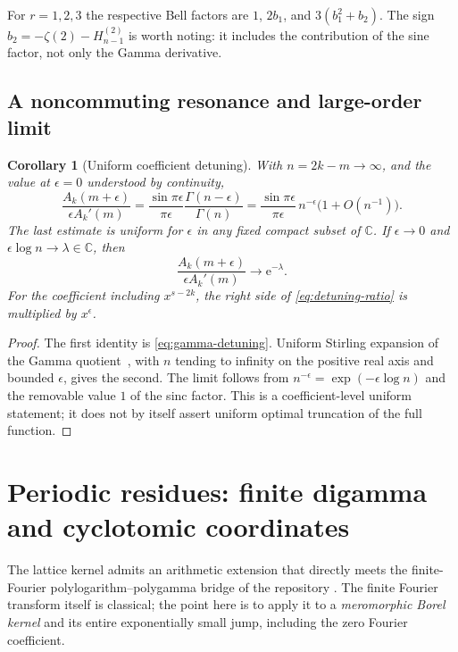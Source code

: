 \documentclass[11pt,a4paper]{article}
\newtheorem{corollary}[theorem]{Corollary}
\theoremstyle{definition}\newtheorem{definition}[theorem]{Definition}
\theoremstyle{remark}\newtheorem{remark}[theorem]{Remark}
\newcommand{\ee}{\mathrm e}
\newcommand{\C}{\mathbb C}
\numberwithin{equation}{section}
\begin{document}
For $r=1,2,3$ the respective Bell factors are
$1$, $2b_1$, and $3(b_1^2+b_2)$. The sign
$b_2=-\zeta(2)-H_{n-1}^{(2)}$ is worth noting: it includes the contribution
of the sine factor, not only the Gamma derivative.

\subsection{A noncommuting resonance and large-order limit}

\begin{corollary}[Uniform coefficient detuning]\label{cor:detuning}
With $n=2k-m\to\infty$, and the value at $\epsilon=0$ understood by
continuity,
\begin{equation}\label{eq:detuning-ratio}
 \frac{A_k(m+\epsilon)}{\epsilon A_k'(m)}
  =\frac{\sin\pi\epsilon}{\pi\epsilon}
          \frac{\Gamma(n-\epsilon)}{\Gamma(n)}
  =\frac{\sin\pi\epsilon}{\pi\epsilon}\,
          n^{-\epsilon}\bigl(1+O(n^{-1})\bigr).
\end{equation}
The last estimate is uniform for $\epsilon$ in any fixed compact subset of
$\C$. If $\epsilon\to0$ and $\epsilon\log n\to\lambda\in\C$, then
\begin{equation}\label{eq:detuning-limit}
 \frac{A_k(m+\epsilon)}{\epsilon A_k'(m)}\longrightarrow\ee^{-\lambda}.
\end{equation}
For the coefficient including $x^{s-2k}$, the right side of
\eqref{eq:detuning-ratio} is multiplied by $x^\epsilon$.
\end{corollary}
\begin{proof}
The first identity is \eqref{eq:gamma-detuning}. Uniform Stirling expansion
of the Gamma quotient~\cite{DLMFratio}, with $n$ tending to infinity on the positive real
axis and bounded $\epsilon$, gives the second. The limit follows from
$n^{-\epsilon}=\exp(-\epsilon\log n)$ and the removable value $1$ of the
sinc factor. This is a coefficient-level uniform statement; it does not
by itself assert uniform optimal truncation of the full function.
\end{proof}

\section{Periodic residues: finite digamma and cyclotomic coordinates}\label{sec:periodic}

The lattice kernel admits an arithmetic extension that directly meets the
finite-Fourier polylogarithm--polygamma bridge of the repository
\cite{RepoBridge}. The finite Fourier transform itself is classical;
the point here is to apply it to a \emph{meromorphic Borel kernel} and its
entire exponentially small jump, including the zero Fourier coefficient.
\end{document}
